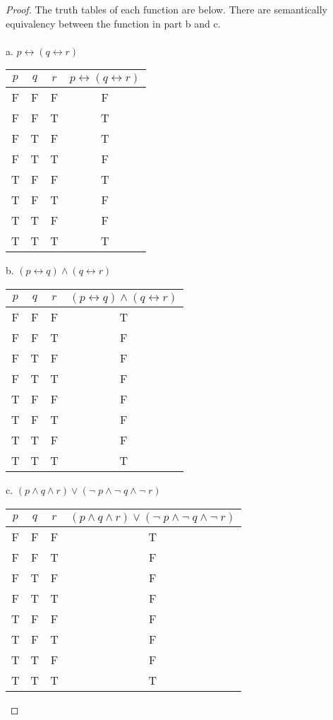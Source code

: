 \documentclass[12pt]{article}
\begin{document}
\begin{proof}
The truth tables of each function are below. There are semantically equivalency between the function in part b and c. \\ \\
a. $p \leftrightarrow (q \leftrightarrow r)$
\begin{center}
\begin{tabular}{ |c|c|c|c| } 
 \hline
 $p$ & $q$ & $r$ & $p \leftrightarrow (q \leftrightarrow r)$\\ 
 \hline
 F & F & F & F \\ 
 \hline 
 F & F & T & T \\ 
 \hline
 F & T & F & T \\
 \hline 
 F & T & T & F \\ 
 \hline 
 T & F & F & T \\ 
 \hline 
 T & F & T & F \\ 
 \hline 
 T & T & F & F \\ 
 \hline 
 T & T & T & T \\ 
 \hline 
\end{tabular}
\end{center}

\newpage 

b. $(p \leftrightarrow q) \land (q \leftrightarrow r)$
\begin{center}
\begin{tabular}{ |c|c|c|c| } 
 \hline
 $p$ & $q$ & $r$ & $(p \leftrightarrow q) \land (q \leftrightarrow r)$\\ 
 \hline
 F & F & F & T \\ 
 \hline 
 F & F & T & F \\ 
 \hline
 F & T & F & F \\
 \hline 
 F & T & T & F \\ 
 \hline 
 T & F & F & F \\ 
 \hline 
 T & F & T & F \\ 
 \hline 
 T & T & F & F \\ 
 \hline 
 T & T & T & T \\ 
 \hline 
\end{tabular}
\end{center}

c. $(p \land q \land r) \lor (\neg\; p \land \neg\; q \land \neg\; r)$
\begin{center}
\begin{tabular}{ |c|c|c|c| } 
 \hline
 $p$ & $q$ & $r$ & $(p \land q \land r) \lor (\neg\; p \land \neg\; q \land \neg\; r)$\\ 
 \hline
 F & F & F & T \\ 
 \hline 
 F & F & T & F \\ 
 \hline
 F & T & F & F \\
 \hline 
 F & T & T & F \\ 
 \hline 
 T & F & F & F \\ 
 \hline 
 T & F & T & F \\ 
 \hline 
 T & T & F & F \\ 
 \hline 
 T & T & T & T \\ 
 \hline 
\end{tabular}
\end{center}


\end{proof}
\end{document}
